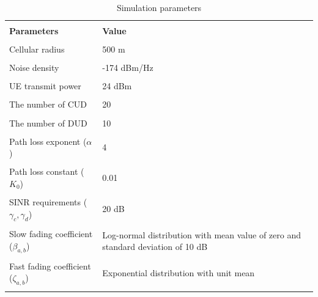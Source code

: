 \documentclass[conference]{IEEEtran}
\begin{document}
\begin{table}[!t]
  \centering
  \scriptsize
  \caption{Simulation parameters}
  \label{tab:notations}
  \begin{tabular}{m{3cm}m{3cm}}
    \\[-2mm]
    \hline\\[-2mm]
    {\bf  Parameters}& {\bf Value}\\
    \hline
    \hline
    \vspace{1mm}\\[-3mm]
    Cellular radius      &    500 m\\
    \hline
    \vspace{1mm}\\[-3mm]
    Noise density &    -174 dBm/Hz \\
    \hline
    \vspace{1mm}\\[-3mm]
    UE transmit power  &  24 dBm\\
    \hline
    \vspace{1mm}\\[-3mm]
    The number of CUD  &  20 \\
    \hline
    \vspace{1mm}\\[-3mm]
    The number of DUD  &  10 \\
    \hline
    \vspace{1mm}\\[-3mm]
    Path loss exponent ($\alpha$) &  4 \\
    \hline
    \vspace{1mm}\\[-3mm]
    Path loss constant ($K_0$) &   0.01\\
    \hline
    \vspace{1mm}\\[-3mm]
    SINR requirements ($\gamma_c,\gamma_d$) &  20 dB \\
    \hline
    \vspace{1mm}\\[-3mm]
    Slow fading coefficient ($\beta_{a,b}$) &  Log-normal distribution with mean value of zero and standard deviation of 10 dB\\
    \hline
    \vspace{1mm}\\[-3mm]
    Fast fading coefficient ($\zeta_{a,b}$) &  Exponential distribution with unit mean\\
    \hline
    \vspace{1mm}\\[-3mm]

\end{tabular}
\end{table}
\end{document}
